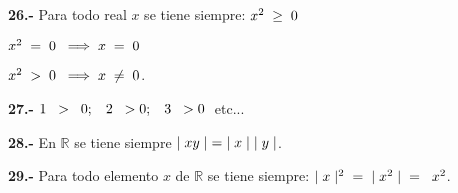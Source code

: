 \documentclass[12pt]{article}
\begin{document}
\textbf{26.-} Para todo real $x$ se tiene siempre: $x^{2} \hspace{0.1cm} \geq \hspace{0.1cm}0$ \vspace{0.1cm}

\hspace{8cm} $x^{2} \hspace{0.1cm} = \hspace{0.1cm}0\hspace{0.2cm} \Longrightarrow\hspace{0.1cm} x\hspace{0.1cm} = \hspace{0.1cm} 0$ \vspace{0.1cm}

\hspace{8cm} $x^{2} \hspace{0.1cm} > \hspace{0.1cm}0\hspace{0.2cm} \Longrightarrow\hspace{0.1cm} x\hspace{0.1cm} \neq\hspace{0.1cm} 0$.
\vspace{0.2cm}

\textbf{27.-} \hspace{0.2cm} $1\hspace{0.2cm}>\hspace{0.2cm}0; \hspace{0.3cm} 2\hspace{0.2cm}>0;\hspace{0.3cm} 3\hspace{0.2cm}>0\hspace{0.1cm}$ etc...\vspace{0.2cm}

\textbf{28.-} En $\mathbb{R}$ se tiene siempre $\mid xy\mid \hspace{0.1cm}=\hspace{0.1cm} \mid x\mid \hspace{0.1cm} \mid y\mid$.
\vspace{0.2cm}

\textbf{29.-} Para todo elemento $x$ de $\mathbb{R}$ se tiene siempre: \hspace{0.1cm} $\mid x \mid^{2} \hspace{0.2cm}=\hspace{0.2cm} \mid x^{2}\mid \hspace{0.2cm}= \hspace{0.2cm} x^{2}$.\vspace{0.2cm}
\end{document}
